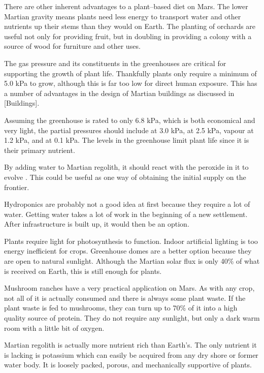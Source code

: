 There are other inherent advantages to a plant--based diet on Mars. The lower Martian gravity means plants need less energy to transport water and other nutrients up their stems than they would on Earth. The planting of orchards are useful not only for providing fruit, but in doubling in providing a colony with a source of wood for furniture and other uses.

The gas pressure and its constituents in the greenhouses are critical for supporting the growth of plant life. Thankfully plants only require a minimum of 5.0 kPa to grow, although this is far too low for direct human exposure. This has a number of advantages in the design of Martian buildings as discussed in [Buildings].

Assuming the greenhouse is rated to only 6.8 kPa, which is both economical and very light, the partial pressures should include  at 3.0 kPa,  at 2.5 kPa,  vapour at 1.2 kPa, and  at 0.1 kPa. The  levels in the greenhouse limit plant life since it is their primary nutrient. 

By adding water to Martian regolith, it should react with the peroxide in it to evolve . This could be useful as one way of obtaining the initial supply on the frontier.

Hydroponics are probably not a good idea at first because they require a lot of water. Getting water takes a lot of work in the beginning of a new settlement. After infrastructure is built up, it would then be an option.

Plants require light for photosynthesis to function. Indoor artificial lighting is too energy inefficient for crops. Greenhouse domes are a better option because they are open to natural sunlight. Although the Martian solar flux is only 40\% of what is received on Earth, this is still enough for plants.

Mushroom ranches have a very practical application on Mars. As with any crop, not all of it is actually consumed and there is always some plant waste. If the plant waste is fed to mushrooms, they can turn up to 70\% of it into a high quality source of protein. They do not require any sunlight, but only a dark warm room with a little bit of oxygen.


Martian regolith is actually more nutrient rich than Earth's. The only nutrient it is lacking is potassium which can easily be acquired from any dry shore or former water body. It is loosely packed, porous, and mechanically supportive of plants.

